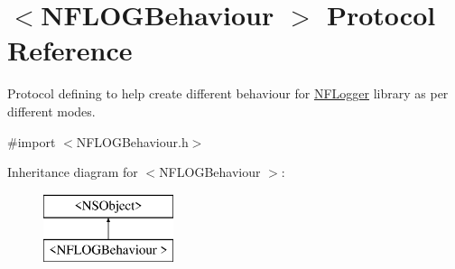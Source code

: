 \hypertarget{protocol_n_f_l_o_g_behaviour_01-p}{}\section{$<$N\+F\+L\+O\+G\+Behaviour $>$ Protocol Reference}
\label{protocol_n_f_l_o_g_behaviour_01-p}


Protocol defining to help create different behaviour for \hyperlink{interface_n_f_logger}{N\+F\+Logger} library as per different modes.  




{\ttfamily \#import $<$N\+F\+L\+O\+G\+Behaviour.\+h$>$}

Inheritance diagram for $<$N\+F\+L\+O\+G\+Behaviour $>$\+:\begin{figure}[H]
\begin{center}
\leavevmode
\includegraphics[height=2.000000cm]{protocol_n_f_l_o_g_behaviour_01-p}
\end{center}
\end{figure}
